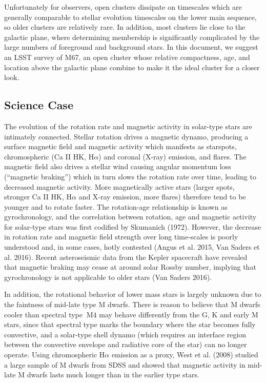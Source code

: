 Unfortunately for observers, open clusters dissipate on timescales which are
generally comparable to stellar evolution timescales on the lower main
sequence, so older clusters are relatively rare.
In addition, most clusters lie close to the galactic plane, where determining
membership is significantly complicated by the large numbers of foreground and
background stars.
In this document, we suggest an LSST survey of M67, an open cluster whose
relative compactness, age, and location above the galactic plane combine to
make it the ideal cluster for a closer look.

\subsection{Science Case }

The evolution of the rotation rate and magnetic activity in solar-type
stars are intimately connected. Stellar rotation drives a magnetic
dynamo, producing a surface magnetic field and magnetic activity which
manifests as starspots, chromospheric (Ca II HK, H$\alpha$) and coronal
(X-ray) emission, and flares. The magnetic field also drives a stellar
wind causing angular momentum loss (\textquotedblleft{}magnetic braking'')
which in turn slows the rotation rate over time, leading to decreased
magnetic activity. More magnetically active stars (larger spots, stronger
Ca II HK, H$\alpha$ and X-ray emission, more flares) therefore tend
to be younger and to rotate faster. The rotation-age relationship
is known as gyrochronology, and the correlation between rotation,
age and magnetic activity for solar-type stars was first codified
by Skumanich (1972). However, the decrease in rotation rate and magnetic
field strength over long time-scales is poorly understood and, in
some cases, hotly contested (Angus et al. 2015, Van Saders et al.
2016). Recent asteroseismic data from the Kepler spacecraft have revealed
that magnetic braking may cease at around solar Rossby number, implying
that gyrochronology is not applicable to older stars (Van Saders 2016).

In addition, the rotational behavior of lower mass stars is largely
unknown due to the faintness of mid-late type M dwarfs. There is reason
to believe that M dwarfs cooler than spectral type $~\mathrm{M}4$
may behave differently from the G, K and early M stars, since that
spectral type marks the boundary where the star becomes fully convective,
and a solar-type shell dynamo (which requires an interface region
between the convective envelope and radiative core of the star) can
no longer operate. Using chromospheric H$\alpha$ emission as a proxy,
West et al. (2008) studied a large sample of M dwarfs from SDSS and
showed that magnetic activity in mid-late M dwarfs lasts much longer
than in the earlier type stars.

